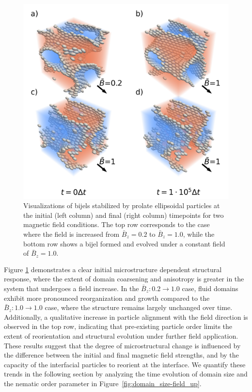 \begin{figure}
\centering 
\includegraphics[scale=0.4]{../figures/results/paper2/microstructure_viz-field_up.png} 
\caption{Visualizations of bijels stabilized by prolate ellipsoidal particles at the initial (left column) and final (right column)
         timepoints for two magnetic field conditions. The top row corresponds to the case where the field is increased from 
         \(\bar{B}_z = 0.2\) to \(\bar{B}_z = 1.0\), while the bottom row shows a bijel formed and evolved under a constant field of 
         \(\bar{B}_z = 1.0\). }
\label{fig:microstructure_viz-field_up}
\end{figure}

Figure \ref{fig:microstructure_viz-field_up} demonstrates a clear initial microstructure dependent structural response, 
where the extent of domain coarsening and anisotropy is greater 
in the system that undergoes a field increase. In the \(\bar{B}_z: 0.2 \rightarrow 1.0\) case, fluid domains exhibit more pronounced reorganization and growth 
compared to the \(\bar{B}_z: 1.0 \rightarrow 1.0\) case, where the structure remains largely unchanged over time.
Additionally, a qualitative increase in particle alignment with the field direction is observed in the top row, indicating that pre-existing particle order 
limits the extent of reorientation and structural evolution under further field application. These results suggest that the degree of microstructural change 
is influenced by the difference between the initial and final magnetic field strengths, and by the capacity of the interfacial particles to reorient at the interface. 
We quantify these trends in the following section by analyzing the time evolution of domain size and the nematic order parameter in 
Figure~\ref{fig:domain_size-field_up}.

